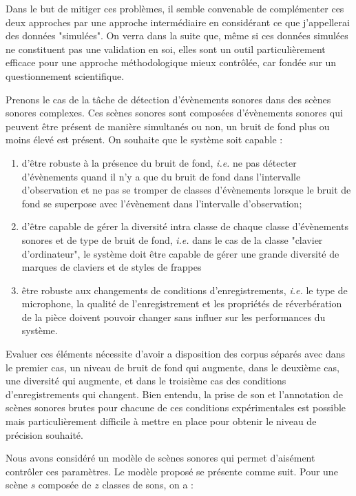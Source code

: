 Dans le but de mitiger ces problèmes, il semble convenable de complémenter ces deux approches par une approche intermédiaire en considérant ce que j'appellerai des données "simulées". On verra dans la suite que, même si ces données simulées ne constituent pas une validation en soi, elles sont un outil particulièrement efficace pour une approche méthodologique mieux contrôlée, car fondée sur un questionnement scientifique.

Prenons le cas de la tâche de détection d'évènements sonores dans des scènes sonores complexes. Ces scènes sonores sont composées d'évènements sonores qui peuvent être présent de manière simultanés ou non, un bruit de fond plus ou moins élevé est présent. On souhaite que le système soit capable :
\begin{enumerate}
  \item d'être robuste à la présence du bruit de fond, \textit{i.e.} ne pas détecter d'évènements quand il n'y a que du bruit de fond dans l'intervalle d'observation et ne pas se tromper de classes d'évènements lorsque le bruit de fond se superpose avec l'évènement  dans l'intervalle d'observation;
  \item d'être capable de gérer la diversité intra classe de chaque classe d'évènements sonores et de type de bruit de fond,  \textit{i.e.} dans le cas de la classe "clavier d'ordinateur", le système doit être capable de gérer une grande diversité de marques de claviers et de styles de frappes
  \item être robuste aux changements de conditions d'enregistrements,  \textit{i.e.} le type de microphone, la qualité de l'enregistrement et les propriétés de réverbération de la pièce doivent pouvoir changer sans influer sur les performances du système.
\end{enumerate}

Evaluer ces éléments nécessite d'avoir a disposition des corpus séparés avec dans le premier cas, un niveau de bruit de fond qui augmente, dans le deuxième cas, une diversité qui augmente, et dans le troisième cas des conditions d'enregistrements qui changent. Bien entendu, la prise de son et l'annotation de scènes sonores brutes pour chacune de ces conditions expérimentales est possible mais particulièrement difficile à mettre en place pour obtenir le niveau de précision souhaité.

Nous avons considéré un modèle de scènes sonores qui permet d'aisément contrôler ces paramètres. Le modèle proposé se présente comme suit. Pour une scène $s$ composée de $z$ classes de sons, on a :

